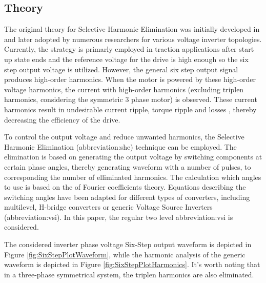 \documentclass[a4paper, twoside, 11pt]{article}
\begin{document}
    \subsection{Theory}\label{subsec:she-theory}
    The original theory for Selective Harmonic Elimination was initially developed in \cite{patel-Generalized-Techniques-of-Harmonic-Elimination-and-Voltage-Control-in-Thyristor-Inverters:-Part-I--Harmonic-Elimination, patel-Generalized-Techniques-of-Harmonic-Elimination-and-Voltage-Control-in-Thyristor-Inverters:-Part-II-----Voltage-Control-Techniques} and later adopted by numerous researchers for various voltage inverter topologies. Currently, the strategy is primarly employed in traction applications after start up state ends and the reference voltage for the drive is high enough so the six step output voltage is utilized. However, the general six step output signal produces high-order harmonics. When the motor is powered by these high-order voltage harmonics, the current with high-order harmonics (excluding triplen harmonics, considering the symmetric 3 phase motor) is observed. These current harmonics result in undesirable current ripple, torque ripple and losses \cite{mullner-Modelling-and-precalculation-of-additional-losses-of-inverter-fed-asynchronous-induction-machines-for-traction-applications}, thereby decreasing the efficiency of the drive.\par
    To control the output voltage and reduce unwanted harmonics, the Selective Harmonic Elimination (\gls{abbreviation:she}) technique can be employed. The elimination is based on generating the output voltage by switching components at certain phase angles, thereby generating waveform with a number of pulses, to corresponding the number of elliminated harmonics. The calculation which angles to use is based on the of Fourier coefficients theory. Equations describing the switching angles have been adapted for different types of converters, including multilevel, H-bridge converters or generic Voltage Source Inverters (\gls{abbreviation:vsi}). In this paper, the regular two level \gls{abbreviation:vsi} is considered.\par
    The considered inverter phase voltage Six-Step output waveform is depicted in Figure \ref{fig:SixStepPlotWaveform}, while the harmonic analysis of the generic waveform is depicted in Figure \ref{fig:SixStepPlotHarmonics}.  It's worth noting that in a three-phase symmetrical system, the triplen harmonics are also eliminated.
\end{document}
